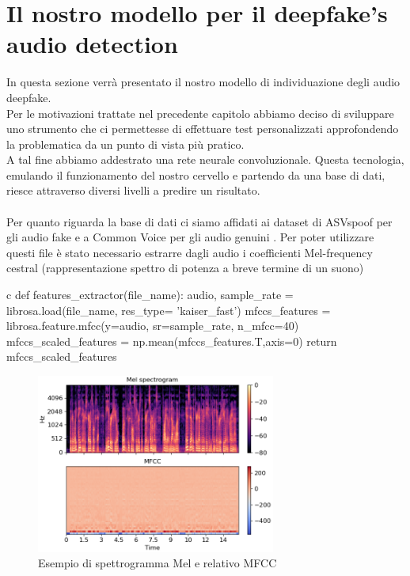 \documentclass[12pt, a4paper]{article}
\begin{document}
\section{Il nostro modello per il deepfake's audio detection}
In questa sezione verrà presentato il nostro modello di individuazione degli audio deepfake. \\
Per le motivazioni trattate nel precedente capitolo abbiamo deciso di sviluppare uno strumento che ci permettesse di effettuare test personalizzati approfondendo la problematica da un punto di vista più pratico.\\
A tal fine abbiamo addestrato una rete neurale convoluzionale. Questa tecnologia, emulando il funzionamento del nostro cervello e partendo da una base di dati, riesce attraverso diversi livelli a predire un risultato. \\\\
Per quanto riguarda la base di dati ci siamo affidati ai dataset di ASVspoof per gli audio fake \cite{FakeAudioDataset} e a Common Voice per gli audio genuini \cite{RealAudioDataset}.
Per poter utilizzare questi file è stato necessario estrarre dagli audio i coefficienti Mel-frequency cestral (rappresentazione spettro di potenza a breve termine di un suono)\\
\begin{code}
\label{code:python-code}
\begin{pythoncode}{c}
def features_extractor(file_name):
    audio, sample_rate = librosa.load(file_name, res_type= 'kaiser_fast') 
    mfccs_features = librosa.feature.mfcc(y=audio, sr=sample_rate, n_mfcc=40)
    mfccs_scaled_features = np.mean(mfccs_features.T,axis=0) 
    return mfccs_scaled_features  
\end{pythoncode}
\end{code}
\begin{figure}[h]
    \centering
    \includegraphics[width=0.7\textwidth]{img/librosa-feature-mfcc-1_00.png}
    \caption{Esempio di spettrogramma Mel e relativo MFCC }
\end{figure} 
\end{document}
